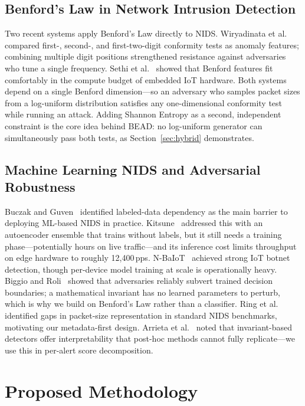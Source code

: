 \documentclass[conference]{IEEEtran}
\begin{document}
\subsection{Benford's Law in Network Intrusion Detection}

Two recent systems apply Benford's Law directly to NIDS. Wiryadinata et
al.~\cite{b25} compared first-, second-, and first-two-digit conformity
tests as anomaly features; combining multiple digit positions strengthened
resistance against adversaries who tune a single frequency. Sethi et
al.~\cite{b26} showed that Benford features fit comfortably in the compute
budget of embedded IoT hardware. Both systems depend on a single Benford
dimension—so an adversary who samples packet sizes from a log-uniform
distribution satisfies any one-dimensional conformity test while running an
attack. Adding Shannon Entropy as a second, independent constraint is the
core idea behind BEAD: no log-uniform generator can simultaneously pass
both tests, as Section~\ref{sec:hybrid} demonstrates.

\subsection{Machine Learning NIDS and Adversarial Robustness}

Buczak and Guven~\cite{b16} identified labeled-data dependency as the
main barrier to deploying ML-based NIDS in practice. Kitsune~\cite{b14}
addressed this with an autoencoder ensemble that trains without labels,
but it still needs a training phase—potentially hours on live traffic—and
its inference cost limits throughput on edge hardware to roughly
12,400\,pps. N-BaIoT~\cite{b15} achieved strong IoT botnet detection,
though per-device model training at scale is operationally heavy. Biggio
and Roli~\cite{b3} showed that adversaries reliably subvert trained
decision boundaries; a mathematical invariant has no learned parameters to
perturb, which is why we build on Benford's Law rather than a classifier.
Ring et al.~\cite{b17} identified gaps in packet-size representation in
standard NIDS benchmarks, motivating our metadata-first design. Arrieta et
al.~\cite{b18} noted that invariant-based detectors offer interpretability
that post-hoc methods cannot fully replicate—we use this in per-alert
score decomposition.

\section{Proposed Methodology}
\end{document}
